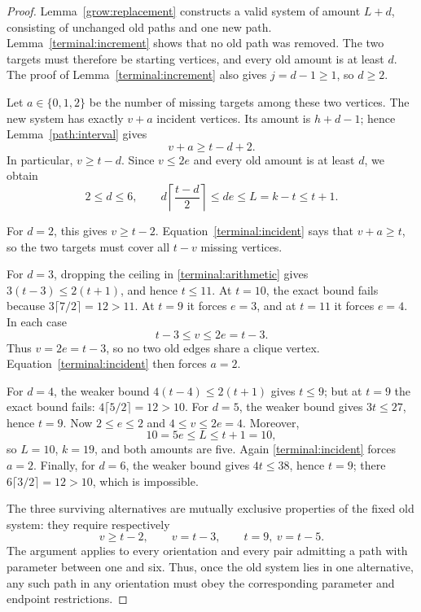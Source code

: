 \begin{proof}
Lemma~\ref{grow:replacement} constructs a valid system of amount \(L+d\),
consisting of unchanged old paths and one new path.
Lemma~\ref{terminal:increment} shows that no old path was removed.
The two targets must therefore be starting vertices, and every old amount
is at least \(d\).
The proof of Lemma~\ref{terminal:increment} also gives \(j=d-1\ge1\), so
\(d\ge2\).

Let \(a\in\{0,1,2\}\) be the number of missing targets among these two
vertices.  The new system has exactly \(v+a\) incident vertices.
Its amount is \(h+d-1\); hence Lemma~\ref{path:interval} gives
\begin{equation}\label{terminal:incident}
 v+a\ge t-d+2.
\end{equation}
In particular, \(v\ge t-d\).  Since \(v\le2e\) and every old amount is at
least \(d\), we obtain
\begin{equation}\label{terminal:arithmetic}
 2\le d\le6,\qquad
 d\left\lceil\frac{t-d}{2}\right\rceil
 \le de\le L=k-t\le t+1.
\end{equation}

For \(d=2\), this gives \(v\ge t-2\).
Equation~\eqref{terminal:incident} says that \(v+a\ge t\), so the two targets
must cover all \(t-v\) missing vertices.

For \(d=3\), dropping the ceiling in \eqref{terminal:arithmetic} gives
\(3(t-3)\le2(t+1)\), and hence \(t\le11\).
At \(t=10\), the exact bound fails because
\(3\lceil7/2\rceil=12>11\).
At \(t=9\) it forces \(e=3\), and at \(t=11\) it forces \(e=4\).
In each case
\[
 t-3\le v\le2e=t-3.
\]
Thus \(v=2e=t-3\), so no two old edges share a clique vertex.
Equation~\eqref{terminal:incident} then forces \(a=2\).

For \(d=4\), the weaker bound \(4(t-4)\le2(t+1)\) gives \(t\le9\);
but at \(t=9\) the exact bound fails:
\(4\lceil5/2\rceil=12>10\).
For \(d=5\), the weaker bound gives \(3t\le27\), hence \(t=9\).
Now \(2\le e\le2\) and \(4\le v\le2e=4\).
Moreover,
\[
 10=5e\le L\le t+1=10,
\]
so \(L=10\), \(k=19\), and both amounts are five.
Again \eqref{terminal:incident} forces \(a=2\).
Finally, for \(d=6\), the weaker bound gives \(4t\le38\), hence \(t=9\);
there \(6\lceil3/2\rceil=12>10\), which is impossible.

The three surviving alternatives are mutually exclusive properties of
the fixed old system: they require respectively
\[
 v\ge t-2,\qquad v=t-3,\qquad t=9,\ v=t-5.
\]
The argument applies to every orientation and every pair admitting a
path with parameter between one and six.  Thus, once the old system lies in
one alternative, any such path in any orientation must obey the corresponding
parameter and endpoint restrictions.
\end{proof}

